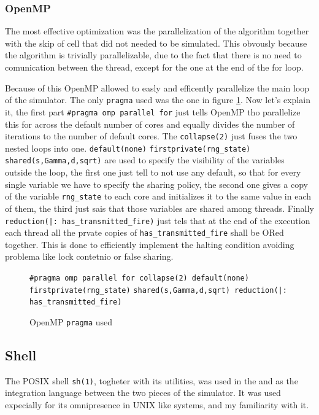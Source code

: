\documentclass[Lau]{sapthesis} %
\begin{document}
\subsubsection{OpenMP}

The most effective optimization was the parallelization of the algorithm
together with the skip of cell that did not needed to be simulated. This
obvously because the algorithm is trivially parallelizable, due to the fact that
there is no need to comunication between the thread, except for the one at the
end of the for loop.

Because of this OpenMP allowed to easly and efficently parallelize the main loop
of the simulator. The only \texttt{pragma} used was the one in figure
\ref{fig:pragma}. Now let's explain it, the first part \verb+#pragma omp parallel for+
just tells OpenMP tho parallelize this for across the default number of cores
and equally divides the number of iterations to the number of default cores. The
\texttt{collapse(2)} just fuses the two nested loops into one.
\verb+default(none)+ \verb+firstprivate(rng_state)+ \verb+shared(s,Gamma,d,sqrt)+
are used to specify the visibility of the variables outside the loop, the first
one just tell to not use any default, so that for every single variable we have
to specify the sharing policy, the second one gives a copy of the variable
\verb+rng_state+ to each core and initializes it to the same value in each of
them, the third just sais that those variables are shared among threads. Finally
\verb+reduction(|: has_transmitted_fire)+ just tels that at the end of the
execution each thread all the prvate copies of \verb+has_transmitted_fire+ shall
be ORed together. This is done to efficiently implement the halting condition
avoiding problema like lock contetnio or false sharing.

\begin{figure}
\centering
\footnotesize
\verb+#pragma omp parallel for collapse(2) default(none) firstprivate(rng_state)+
\verb+shared(s,Gamma,d,sqrt) reduction(|: has_transmitted_fire)+
\caption{OpenMP \texttt{pragma} used}
\label{fig:pragma}
\end{figure}

\subsection{Shell}

The POSIX shell \texttt{sh(1)}, togheter with its utilities, was used in the and
as the integration language between the two pieces of the simulator. It was used
expecially for its omnipresence in UNIX like systems, and my familiarity with
it.
\end{document}
